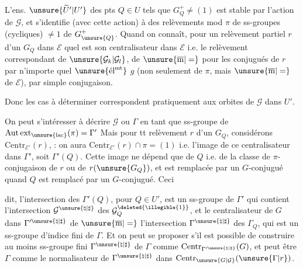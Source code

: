 
L'ens. $\unsure{\widetilde U'|U'}$ des pts $Q\in U$ tels que $G_Q^+\ne(1)$ est stable par l'action de $\mathcal G$, et s'identifie (avec cette action) à  des relèvements  mod $\pi$ de ss-groupes (cycliques) $\ne1$ de $G_{\unsure{Q}}^+$. Quand on connaît, pour un relèvement partiel $r$ d'un $G_Q$ dans $\mathcal E$ quel est son centralisateur dans $\mathcal E$ i.e. le relèvement correspondant de $\unsure{\mathcal G_k|\mathcal G_l}$,  de $\unsure{\overline{\mathrm m}|=}$ pour les conjugués de $r$ par n'importe quel $\unsure{\text{él}^{\mathrm{mt}}}$ $g$ (non seulement de $\pi$, mais $\unsure{\overline{\mathrm m}|=}$ de $\mathcal E$), par simple conjugaison.

Donc les cas à déterminer correspondent pratiquement aux orbites de $\mathcal G$ dans $U'$.

On peut s'intéresser à décrire $\mathcal G$ ou $\Gamma$ en tant que ss-groupe de $\mathrm{Aut\,ext}_{\unsure{\mathrm{lac}}}(\pi)=\Gamma'$  Mais pour tt relèvement $r$ d'un $G_Q$, considérons $\mathrm{Centr}_{\mathcal E'}(r)$,  : on aura $\mathrm{Centr}_{\mathcal E'}(r)\cap\pi=(1)$ i.e.  l'image de ce centralisateur dans $\Gamma'$, soit $\Gamma'(Q)$. Cette image ne dépend que de $Q$ i.e. de la classe de $\pi$-conjugaison de $r$ ou de $r(\unsure{G_Q})$, et est remplacée par un $G$-conjugué quand $Q$ est remplacé par un $G$-conjugué. Ceci



dit, l'intersection  des $\Gamma'(Q)$, pour $Q\in U'$, est un ss-groupe de $\Gamma'$ qui contient l'intersection  $\mathcal G^{\unsure{\natural|\sharp}}$ des $\mathcal G_Q^{\deleted{\illegible{1}}}$, et le centralisateur de $G$ dans $\Gamma'^{\unsure{\natural|\sharp}}$  de $\unsure{\overline{\mathrm m}|=}$ l'intersection  $\Gamma^{\unsure{\natural|\sharp}}$ des $\Gamma_Q$, qui est un ss-groupe  d'indice fini de $\Gamma$. Et on peut  se proposer s'il est possible de construire au moins  ss-groupe fini $\Gamma^{\unsure{\natural|\sharp}}$ de $\Gamma$ comme $\mathrm{Centr}_{\Gamma'^{\unsure{\natural|\sharp}}}(G)$, et  peut être $\Gamma$ comme le normalisateur de $\Gamma^{\unsure{\natural|\sharp}}$ dans  $\mathrm{Centr}_{\unsure{G|\mathcal G}}(\unsure{\Gamma|r})$.

